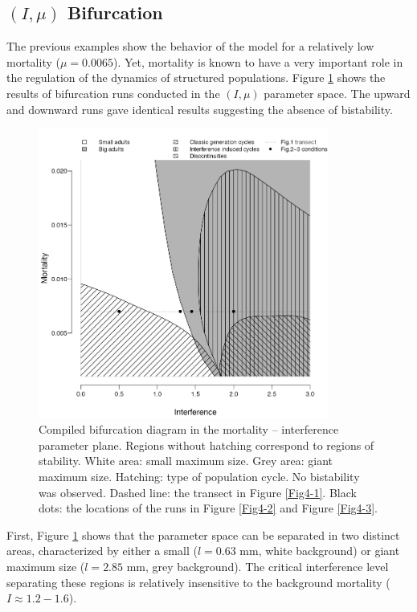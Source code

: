 \subsection{\texorpdfstring{$(I,\mu)$}{(I,mu)} Bifurcation}

The previous examples show the behavior of the model for a relatively low
mortality ($\mu=0.0065$). Yet, mortality is known to have a very important role
in the regulation of the dynamics of structured populations. Figure \ref{Fig4-4}
shows the results of bifurcation runs conducted in the $(I,\mu)$ parameter
space. The upward and downward runs gave identical results suggesting the
absence of bistability.

\begin{figure}[!h] %
\centering
\includegraphics[width=0.85\textwidth]{4_ChapThe1/Fig/Fig4.pdf}
\caption[$(I,\mu)$ stability
diagram]{Compiled bifurcation diagram in the mortality -- interference
parameter plane. Regions without hatching correspond to regions of stability. White area:
small maximum size. Grey area: giant maximum size. Hatching: type of population
cycle. No bistability was observed. Dashed line: the transect in Figure
\ref{Fig4-1}. Black dots: the locations of the runs in Figure \ref{Fig4-2} and
Figure \ref{Fig4-3}.}
\label{Fig4-4}
\end{figure}

First, Figure \ref{Fig4-4} shows that the parameter space can be separated in
two distinct areas, characterized by either a small ($l=0.63$ mm, white
background) or giant maximum size ($l=2.85$ mm, grey background). The critical
interference level separating these regions is relatively insensitive to the
background mortality ($I \approx 1.2-1.6$).

